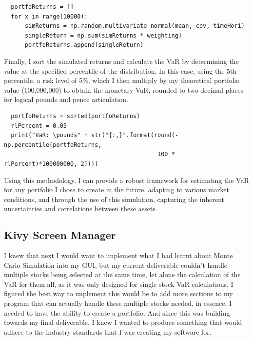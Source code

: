 \documentclass{article}
\begin{document}
\begin{verbatim}
  portfoReturns = []
  for x in range(10000):
      simReturns = np.random.multivariate_normal(mean, cov, timeHori)
      singleReturn = np.sum(simReturns * weighting)
      portfoReturns.append(singleReturn)
\end{verbatim}

\vspace{0.3cm}
Finally, I sort the simulated returns and calculate the VaR by determining the value at the specified percentile of the distribution. In this case, using the 5th percentile, a risk level of 5\%, which I then multiply by my theoretical portfolio value (100,000,000) to obtain the monetary VaR, rounded to two decimal places for logical pounds and pence articulation.\\\vspace{0.3cm}

\begin{verbatim}
  portfoReturns = sorted(portfoReturns)
  rlPercent = 0.05
  print("VaR: \pounds" + str("{:,}".format(round(-np.percentile(portfoReturns, 
                                            100 * rlPercent)*100000000, 2))))
\end{verbatim}

\vspace{0.3cm}
Using this methodology, I can provide a robust framework for estimating the VaR for any portfolio I chose to create in the future, adapting to various market conditions, and through the use of this simulation, capturing the inherent uncertainties and correlations between these assets.


\subsection{Kivy Screen Manager}
I knew that next I would want to implement what I had learnt about Monte Carlo Simulation into my GUI, but my current deliverable couldn't handle multiple stocks being selected at the same time, let alone the calculation of the VaR for them all, as it was only designed for single stock VaR calculations. I figured the best way to implement this would be to add more sections to my program that can actually handle these multiple stocks needed, in essence, I needed to have the ability to create a portfolio. And since this was building towards my final deliverable, I knew I wanted to produce something that would adhere to the industry standards that I was creating my software for.\\\vspace{0.3cm}
\end{document}
